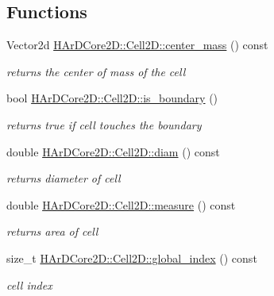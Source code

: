 \subsection*{Functions}
\begin{DoxyCompactItemize}
\item 
\mbox{\label{group__Mesh2D_gaea8651d1aa09dcea4701a35ecd032283}} 
Vector2d \hyperlink{group__Mesh2D_gaea8651d1aa09dcea4701a35ecd032283}{H\+Ar\+D\+Core2\+D\+::\+Cell2\+D\+::center\+\_\+mass} () const
\begin{DoxyCompactList}\small\item\em returns the center of mass of the cell \end{DoxyCompactList}\item 
\mbox{\label{group__Mesh2D_ga733ae701085975f6bc1f5ac33ef9f984}} 
bool \hyperlink{group__Mesh2D_ga733ae701085975f6bc1f5ac33ef9f984}{H\+Ar\+D\+Core2\+D\+::\+Cell2\+D\+::is\+\_\+boundary} ()
\begin{DoxyCompactList}\small\item\em returns true if cell touches the boundary \end{DoxyCompactList}\item 
\mbox{\label{group__Mesh2D_ga6ee4beb02e00b38ef4af808e2241aa6a}} 
double \hyperlink{group__Mesh2D_ga6ee4beb02e00b38ef4af808e2241aa6a}{H\+Ar\+D\+Core2\+D\+::\+Cell2\+D\+::diam} () const
\begin{DoxyCompactList}\small\item\em returns diameter of cell \end{DoxyCompactList}\item 
\mbox{\label{group__Mesh2D_ga2a06116757ca98552878eef4c1bb3694}} 
double \hyperlink{group__Mesh2D_ga2a06116757ca98552878eef4c1bb3694}{H\+Ar\+D\+Core2\+D\+::\+Cell2\+D\+::measure} () const
\begin{DoxyCompactList}\small\item\em returns area of cell \end{DoxyCompactList}\item 
\mbox{\label{group__Mesh2D_ga5c51190fdf2037fd2d6289f4c7f583e0}} 
size\+\_\+t \hyperlink{group__Mesh2D_ga5c51190fdf2037fd2d6289f4c7f583e0}{H\+Ar\+D\+Core2\+D\+::\+Cell2\+D\+::global\+\_\+index} () const
\begin{DoxyCompactList}\small\item\em cell index \end{DoxyCompactList}\item 

\end{DoxyCompactItemize}
